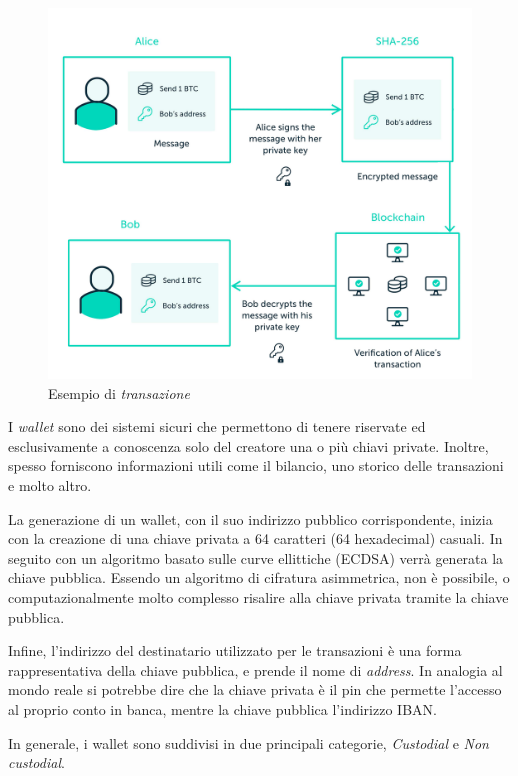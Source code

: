 \begin{figure}[ht]
\centering
\includegraphics[scale=0.15]{images/PrivatePublicKeys}
\caption{Esempio di  \emph{transazione}}
\label{fig:privatePublicKeys}
\end{figure}

I \textit{wallet} sono dei sistemi sicuri che permettono di tenere riservate ed esclusivamente a conoscenza solo del creatore una o più chiavi private.
Inoltre, spesso forniscono informazioni utili come il bilancio, uno storico delle transazioni e molto altro.

La generazione di un wallet, con il suo indirizzo pubblico corrispondente, inizia con la creazione di una chiave privata a 64 caratteri (64 hexadecimal) casuali.
In seguito con un algoritmo basato sulle curve ellittiche (ECDSA) verrà generata la chiave pubblica. Essendo un algoritmo di cifratura asimmetrica, non è possibile, o computazionalmente molto complesso risalire alla chiave privata tramite la chiave pubblica. \cite{ledger-privatekey}

Infine, l'indirizzo del destinatario utilizzato per le transazioni è una forma rappresentativa della chiave pubblica, e prende il nome di \textit{address}.
In analogia al mondo reale si potrebbe dire che la chiave privata è il pin che permette l'accesso al proprio conto in banca, mentre la chiave pubblica l'indirizzo IBAN. \cite{blockchain-chiavi}

In generale, i wallet sono suddivisi in due principali categorie, \textit{Custodial} e \textit{Non custodial}.

